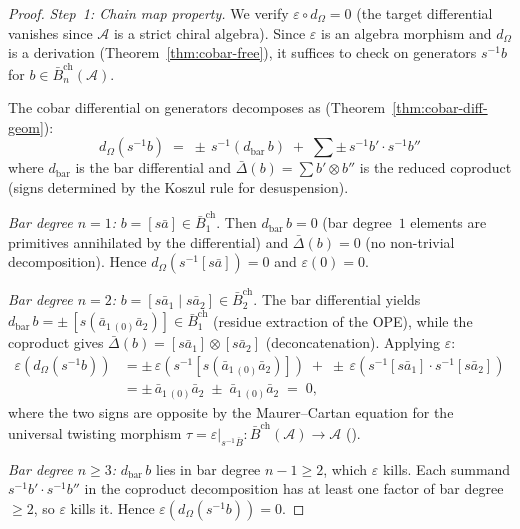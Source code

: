 \begin{proof}
\emph{Step~1: Chain map property.}
We verify $\varepsilon \circ d_\Omega = 0$
(the target differential vanishes since $\mathcal{A}$ is a strict
chiral algebra).  Since $\varepsilon$ is an algebra morphism and
$d_\Omega$ is a derivation
(Theorem~\ref{thm:cobar-free}), it suffices to check on generators
$s^{-1} b$ for $b \in \bar{B}^{\mathrm{ch}}_n(\mathcal{A})$.

The cobar differential on generators decomposes as
(Theorem~\ref{thm:cobar-diff-geom}):
\[
d_\Omega(s^{-1} b)
\;=\; \pm\, s^{-1}(d_{\mathrm{bar}}\, b)
\;+\; \sum \pm\, s^{-1} b' \cdot s^{-1} b''
\]
where $d_{\mathrm{bar}}$ is the bar differential and
$\bar{\Delta}(b) = \sum b' \otimes b''$ is the reduced coproduct
(signs determined by the Koszul rule for desuspension).

\emph{Bar degree $n=1$:}
$b = [s\bar{a}] \in \bar{B}^{\mathrm{ch}}_1$.
Then $d_{\mathrm{bar}}\, b = 0$ (bar degree~$1$ elements are
primitives annihilated by the differential) and
$\bar{\Delta}(b) = 0$ (no non-trivial decomposition).
Hence $d_\Omega(s^{-1}[s\bar{a}]) = 0$ and $\varepsilon(0) = 0$.

\emph{Bar degree $n=2$:}
$b = [s\bar{a}_1 \mid s\bar{a}_2] \in \bar{B}^{\mathrm{ch}}_2$.
The bar differential yields
$d_{\mathrm{bar}}\, b
= \pm\, [s(\bar{a}_{1\,(0)}\bar{a}_2)]
\in \bar{B}^{\mathrm{ch}}_1$
(residue extraction of the OPE), while the coproduct gives
$\bar{\Delta}(b) = [s\bar{a}_1] \otimes [s\bar{a}_2]$
(deconcatenation).
Applying $\varepsilon$:
\begin{align*}
\varepsilon(d_\Omega(s^{-1} b))
&= \pm\, \varepsilon(s^{-1}[s(\bar{a}_{1\,(0)}\bar{a}_2)])
  \;+\; \pm\, \varepsilon(s^{-1}[s\bar{a}_1]
    \cdot s^{-1}[s\bar{a}_2]) \\
&= \pm\, \bar{a}_{1\,(0)}\bar{a}_2
  \;\pm\; \bar{a}_{1\,(0)}\bar{a}_2
\;=\; 0,
\end{align*}
where the two signs are opposite by the Maurer--Cartan equation
for the universal twisting morphism
$\tau = \varepsilon|_{s^{-1}\overline{B}}\colon
\bar{B}^{\mathrm{ch}}(\mathcal{A}) \to \mathcal{A}$
(\cite[\S2.2, Proposition~2.2.6]{LV12}).

\emph{Bar degree $n \geq 3$:}
$d_{\mathrm{bar}}\, b$ lies in bar degree $n{-}1 \geq 2$, which
$\varepsilon$ kills.  Each summand $s^{-1}b' \cdot s^{-1}b''$ in the
coproduct decomposition has at least one factor of bar
degree~$\geq 2$, so $\varepsilon$ kills it.
Hence $\varepsilon(d_\Omega(s^{-1} b)) = 0$.


\end{proof}
